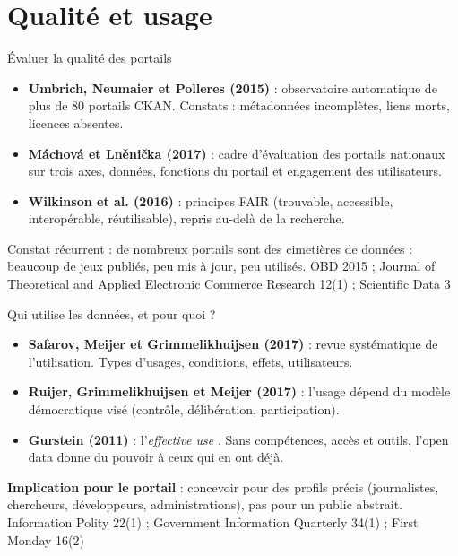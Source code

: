 \documentclass[11pt,aspectratio=169]{beamer}
\newcommand{\refc}[1]{\textcolor{gris}{\footnotesize #1}}
\begin{document}
\section{Qualité et usage}

\begin{frame}{Évaluer la qualité des portails}
  \begin{itemize}
    \item \textbf{Umbrich, Neumaier et Polleres (2015)} : observatoire automatique de plus de 80 portails CKAN. Constats : métadonnées incomplètes, liens morts, licences absentes.
    \item \textbf{Máchová et Lněnička (2017)} : cadre d'évaluation des portails nationaux sur trois axes, données, fonctions du portail et engagement des utilisateurs.
    \item \textbf{Wilkinson et al. (2016)} : principes FAIR (trouvable, accessible, interopérable, réutilisable), repris au-delà de la recherche.
  \end{itemize}
  \vspace{0.6em}
  \alert{Constat récurrent} : de nombreux portails sont des \og cimetières de données \fg{} : beaucoup de jeux publiés, peu mis à jour, peu utilisés.
  \vfill
  \refc{OBD 2015 ; Journal of Theoretical and Applied Electronic Commerce Research 12(1) ; Scientific Data 3}
\end{frame}

\begin{frame}{Qui utilise les données, et pour quoi ?}
  \begin{itemize}
    \item \textbf{Safarov, Meijer et Grimmelikhuijsen (2017)} : revue systématique de l'utilisation. Types d'usages, conditions, effets, utilisateurs.
    \item \textbf{Ruijer, Grimmelikhuijsen et Meijer (2017)} : l'usage dépend du modèle démocratique visé (contrôle, délibération, participation).
    \item \textbf{Gurstein (2011)} : \og l'\emph{effective use} \fg{}. Sans compétences, accès et outils, l'open data donne du pouvoir à ceux qui en ont déjà.
  \end{itemize}
  \vspace{0.6em}
  \textbf{Implication pour le portail} : concevoir pour des profils précis (journalistes, chercheurs, développeurs, administrations), pas pour un \og public \fg{} abstrait.
  \vfill
  \refc{Information Polity 22(1) ; Government Information Quarterly 34(1) ; First Monday 16(2)}
\end{frame}
\end{document}
